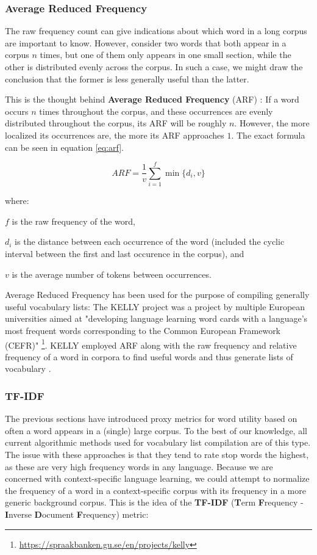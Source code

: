 \subsubsection {Average Reduced Frequency}
The raw frequency count can give indications about which word in a long corpus are important to know.
However, consider two words that both appear in a corpus $n$ times, but one of them only appears in one small section, while the other is distributed evenly across the corpus.
In such a case, we might draw the conclusion that the former is less generally useful than the latter.

This is the thought behind \textbf{Average Reduced Frequency} (ARF) \cite{savickyMeasuresWordCommonness2002}:
If a word occurs $n$ times throughout the corpus, and these occurrences are evenly distributed throughout the corpus, its ARF will be roughly $n$.
However, the more localized its occurrences are, the more its ARF approaches $1$.
The exact formula can be seen in equation \ref{eq:arf}.

\begin{equation}\label{eq:arf}
	ARF = \frac{1}{v}\sum_{i=1}^{f} \min\{d_i,v\}
\end{equation}

where:

$f$ is the raw frequency of the word,

$d_i$ is the distance between each occurrence of the word (included the cyclic interval between the first and last occurence in the corpus), and

$v$ is the average number of tokens between occurrences.

Average Reduced Frequency has been used for the purpose of compiling generally useful vocabulary lists:
The KELLY project was a project by multiple European universities aimed at "developing language learning word cards with a language's most frequent words corresponding to the Common European Framework (CEFR)" \footnote{\url{https://spraakbanken.gu.se/en/projects/kelly}}.
KELLY employed ARF along with the raw frequency and relative frequency of a word in corpora to find useful words and thus generate lists of vocabulary \cite{kokkinakisCorpusbasedApproachesCreation2011}.

\subsubsection {TF-IDF}
The previous sections have introduced proxy metrics for word utility based on often a word appears in a (single) large corpus.
To the best of our knowledge, all current algorithmic methods used for vocabulary list compilation are of this type.
The issue with these approaches is that they tend to rate stop words the highest, as these are very high frequency words in any language.
Because we are concerned with context-specific language learning, we could attempt to normalize the frequency of a word in a context-specific corpus with its frequency in a more generic background corpus.
This is the idea of the \textbf{TF-IDF} (\textbf{T}erm \textbf{F}requency - \textbf{I}nverse \textbf{D}ocument \textbf{F}requency)
 \cite{qaiserTextMiningUse2018} metric:

